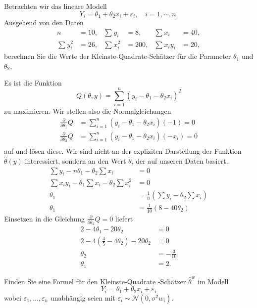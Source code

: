  Betrachten wir das
lineare Modell
\begin{equation*}
    Y_i = \theta_1 + \theta_2 x_i + \varepsilon_i, \quad i=1,\cdots, n.
\end{equation*}
Ausgehend von den Daten
\begin{align*}
    n &=10, & \sum_{}^{} y_i &= 8, & \sum_{}^{} x_i &= 40,  \\
    \sum_{}^{} y_i^2 &= 26, & \sum_{}^{} x_i^2 &= 200, 
    & \sum_{}^{} x_i y_i &= 20,
\end{align*}
berechnen Sie die Werte der Kleinste-Quadrate-Schätzer für die Parameter
$\theta_1$ und $\theta_2$. 

\solution Es ist die Funktion
\begin{equation*}
    Q(\theta,y) = \sum_{i=1}^{n} \left( y_i -\theta_1 -\theta_2 x_i \right)^2
\end{equation*}
zu maximieren. Wir stellen also die Normalgleichungen
\begin{align*}
    \frac{\partial}{\partial \theta_1} Q &= 
    \sum_{i=1}^{n} \left( y_i-\theta_1-\theta_2 x_i \right) (-1) =0 \\
    \frac{\partial}{\partial \theta_2} Q &= 
    \sum_{i=1}^{n} \left( y_i-\theta_1-\theta_2 x_i \right) (-x_i) =0\\
\end{align*}
auf und lösen diese. Wir sind nicht an der expliziten Darstellung der Funktion
$\hat \theta(y)$ interessiert, sondern an den Wert $\hat\theta$, der auf
unseren Daten basiert. 
\begin{align*}
    \sum y_i - n \theta_1 -\theta_2 \sum x_i &= 0 \\
    \sum x_i y_i -\theta_1 \sum x_i -\theta_2 \sum x_i^2 &=0 \\
    \theta_1 &= \frac{1}{n} \left( \sum y_i - \theta_2 \sum x_i \right) \\
    \theta_1 &= \frac{1}{10} \left( 8 - 40 \theta_2 \right) 
\end{align*}
Einsetzen in die Gleichung $\frac{\partial}{\partial \theta_2}Q=0$ liefert
\begin{align*}
    2 - 4\theta_1 - 20\theta_2 &=0 \\
    2 - 4\left( \frac{4}{5}-4\theta_2 \right)- 20 \theta_2 &=0 \\
    \theta_2 &= -\frac{3}{10} \\
    \theta_1 &= 2.
\end{align*}


Finden Sie eine Formel für den Kleinste-Quadrate -Schätzer $\hat \theta^w$
im Modell
\begin{equation*}
	Y_i = \theta_1 + \theta_2 x_i + \varepsilon_i
\end{equation*}
wobei $\varepsilon_1,\ldots, \varepsilon_n$ unabhängig seien mit $\varepsilon_i \sim \mathcal N(0, \sigma^2w_i)$.



